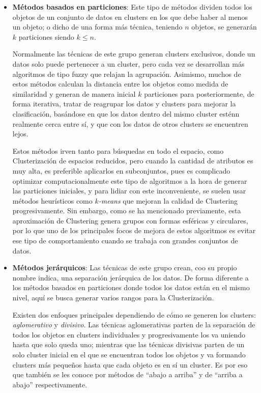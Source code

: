 \documentclass[3p,twocolumn]{elsarticle}
\begin{document}
\begin{itemize}
  \item \textbf{Métodos basados en particiones}: Este tipo de métodos dividen todos los objetos de un conjunto de datos en clusters en los que debe haber al menos un objeto; o dicho de una forma más técnica, teniendo $n$ objetos, se generarán $k$ particiones siendo $k \leq n$. 
  
  Normalmente las técnicas de este grupo generan clusters exclusivos, donde un datos solo puede pertenecer a un cluster, pero cada vez se desarrollan más algoritmos de tipo fuzzy que relajan la agrupación. Asimismo, muchos de estos métodos calculan la distancia entre los objetos como medida de similaridad y generan de manera inicial $k$ particiones para posteriormente, de forma iterativa, tratar de reagrupar los datos y clusters para mejorar la clasificación, basándose en que los datos dentro del mismo cluster esténn realmente cerca entre sí, y que con los datos de otros clusters se encuentren lejos. 
  
  Estos métodos irven tanto para búsquedas en todo el espacio, como Clusterización de espacios reducidos, pero cuando la cantidad de atributos es muy alta, es preferible aplicarlos en subconjuntos, pues es complicado optimizar computacionalmente este tipo de algoritmos a la hora de generar las particiones iniciales, y para lidiar con este inconveniente, se suelen usar métodos heurísticos como \textit{$k$-means} que mejoran la calidad de Clustering progresivamente. Sin embargo, como se ha mencionado previamente, esta aproximación de Clustering genera grupos con formas esféricas y circulares, por lo que uno de los principales focos de mejora de estos algoritmos es evitar ese tipo de comportamiento cuando se trabaja con grandes conjuntos de datos.
  
  \item \textbf{Métodos jerárquicos}: Las técnicas de este grupo crean, coo su propio nombre indica, una separación jerárquica de los datos. De forma diferente a los métodos basados en particiones donde todos los datos están en el mismo nivel, aquí se busca generar varios rangos para la Clusterización. 
  
  Existen dos enfoques principales dependiendo de cómo se generen los clusters: \textit{aglomerativo} y \textit{divisivo}. Las técnicas aglomerativas parten de la separación de todos los objetos en clusters individuales y progresivamente los va uniendo hasta que solo queda uno; mientras que las técnicas divisivas parten de un solo cluster inicial en el que se encuentran todos los objetos y va formando clusters más pequeños hasta que cada objeto es en sí un cluster. Es por eso que también se les conoce por métodos de ``abajo a arriba'' y de ``arriba a abajo'' respectivamente.
  

\end{itemize}
\end{document}
